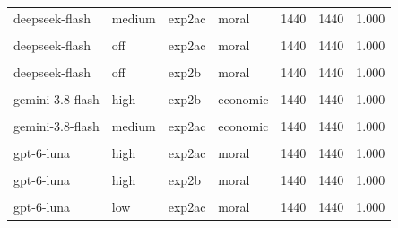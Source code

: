 \documentclass[
]{article}
\begin{document}
\begin{table}[!h]
{\begin{tabular}[t]{llllrrr}
deepseek-flash & medium & exp2ac & moral & 1440 & 1440 & 1.000\\
\cellcolor{gray!10}{deepseek-flash} & \cellcolor{gray!10}{off} & \cellcolor{gray!10}{exp2ac} & \cellcolor{gray!10}{economic} & \cellcolor{gray!10}{1440} & \cellcolor{gray!10}{1440} & \cellcolor{gray!10}{1.000}\\
deepseek-flash & off & exp2ac & moral & 1440 & 1440 & 1.000\\
\addlinespace
\cellcolor{gray!10}{deepseek-flash} & \cellcolor{gray!10}{off} & \cellcolor{gray!10}{exp2b} & \cellcolor{gray!10}{economic} & \cellcolor{gray!10}{1440} & \cellcolor{gray!10}{1440} & \cellcolor{gray!10}{1.000}\\
deepseek-flash & off & exp2b & moral & 1440 & 1440 & 1.000\\
\cellcolor{gray!10}{gemini-3.8-flash} & \cellcolor{gray!10}{high} & \cellcolor{gray!10}{exp2ac} & \cellcolor{gray!10}{economic} & \cellcolor{gray!10}{1440} & \cellcolor{gray!10}{1440} & \cellcolor{gray!10}{1.000}\\
gemini-3.8-flash & high & exp2b & economic & 1440 & 1440 & 1.000\\
\cellcolor{gray!10}{gemini-3.8-flash} & \cellcolor{gray!10}{low} & \cellcolor{gray!10}{exp2b} & \cellcolor{gray!10}{economic} & \cellcolor{gray!10}{1440} & \cellcolor{gray!10}{1440} & \cellcolor{gray!10}{1.000}\\
\addlinespace
gemini-3.8-flash & medium & exp2ac & economic & 1440 & 1440 & 1.000\\
\cellcolor{gray!10}{gpt-6-luna} & \cellcolor{gray!10}{high} & \cellcolor{gray!10}{exp2ac} & \cellcolor{gray!10}{economic} & \cellcolor{gray!10}{1440} & \cellcolor{gray!10}{1440} & \cellcolor{gray!10}{1.000}\\
gpt-6-luna & high & exp2ac & moral & 1440 & 1440 & 1.000\\
\cellcolor{gray!10}{gpt-6-luna} & \cellcolor{gray!10}{high} & \cellcolor{gray!10}{exp2b} & \cellcolor{gray!10}{economic} & \cellcolor{gray!10}{1440} & \cellcolor{gray!10}{1440} & \cellcolor{gray!10}{1.000}\\
gpt-6-luna & high & exp2b & moral & 1440 & 1440 & 1.000\\
\addlinespace
\cellcolor{gray!10}{gpt-6-luna} & \cellcolor{gray!10}{low} & \cellcolor{gray!10}{exp2ac} & \cellcolor{gray!10}{economic} & \cellcolor{gray!10}{1440} & \cellcolor{gray!10}{1440} & \cellcolor{gray!10}{1.000}\\
gpt-6-luna & low & exp2ac & moral & 1440 & 1440 & 1.000\\

\end{tabular}}
\end{table}
\end{document}
